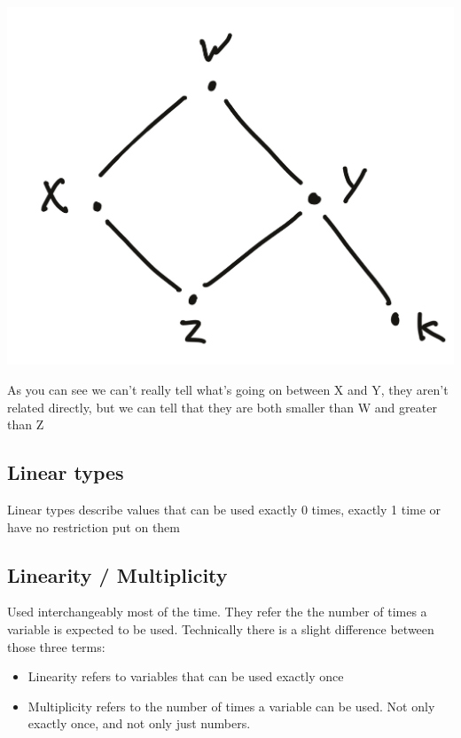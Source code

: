 \documentclass[
]{article}
\providecommand{\tightlist}{%
  \setlength{\itemsep}{0pt}\setlength{\parskip}{0pt}}
\begin{document}
\includegraphics{lattice.jpg}

As you can see we can't really tell what's going on between X and Y,
they aren't related directly, but we can tell that they are both smaller
than W and greater than Z

\hypertarget{linear-types-1}{%
\subsection{Linear types}\label{linear-types-1}}

Linear types describe values that can be used exactly 0 times, exactly 1
time or have no restriction put on them

\hypertarget{linearity-multiplicity}{%
\subsection{Linearity / Multiplicity}\label{linearity-multiplicity}}

Used interchangeably most of the time. They refer the the number of
times a variable is expected to be used. Technically there is a slight
difference between those three terms:

\begin{itemize}
\tightlist
\item
  Linearity refers to variables that can be used exactly once
\item
  Multiplicity refers to the number of times a variable can be used. Not
  only exactly once, and not only just numbers.
\end{itemize}
\end{document}
